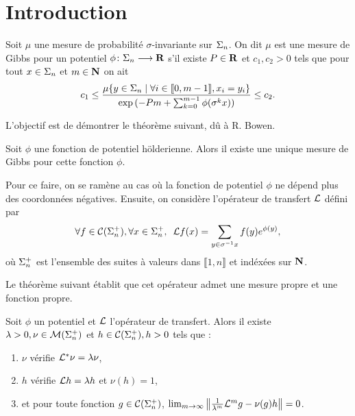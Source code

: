 \section{Introduction}

  \begin{definition}
    Soit $\mu$ une mesure de probabilité $\sigma$-invariante sur $\s_n$.
    On dit $\mu$ est une mesure de Gibbs pour un potentiel $\phi \colon \s_n \longrightarrow \R$ s'il existe $P \in \R$ et $c_1, c_2 > 0$ tels que
    pour tout $x \in \s_n$ et $m \in \N$ on ait
    $$c_1 \leq \frac{\mu\{y \in \s_n \mid \forall i \in \llbracket 0, m-1 \rrbracket, x_i = y_i\}}{\exp{(-Pm + \sum_{k=0}^{m-1}\phi(\sigma^kx))}} \leq c_2.$$
  \end{definition}

  L'objectif est de démontrer le théorème suivant, dû à R. Bowen.

  \begin{theorem}
    Soit $\phi$ une fonction de potentiel hölderienne. Alors il existe une unique mesure de Gibbs pour cette fonction $\phi$.
  \end{theorem}

  Pour ce faire, on se ramène au cas où la fonction de potentiel $\phi$ ne dépend plus des coordonnées négatives.
  Ensuite, on considère l'opérateur de transfert $\L$ défini par
  $$\forall f \in \Csp{n}, \forall x \in \sp_n, \hspace{0.5em} \L f(x) = \sum_{y \in \sigma^{-1}x}f(y)e^{\phi(y)},$$
  où $\sp_n$ est l'ensemble des suites à valeurs dans $\llbracket 1, n\rrbracket$ et indéxées sur $\N$.

  Le théorème suivant établit que cet opérateur admet une mesure propre et une fonction propre.

  \begin{theorem}
    Soit $\phi$ un potentiel et $\L$ l'opérateur de transfert.
    Alors il existe $\lambda > 0, \nu \in \Msp{n}$ et $h \in \Csp{n}, h > 0$ tels que :
    \begin{enumerate}
      \item $\nu$ vérifie $\L^*\nu = \lambda\nu$,
      \item $h$ vérifie $\L h = \lambda h$ et $\nu(h) = 1$,
      \item et pour toute fonction $g \in \Csp{n}$,
	$\lim_{m\to\infty}\No{\frac 1 {\lambda^m} \L^mg - \nu(g)h} = 0$.
    \end{enumerate}
  \end{theorem}

